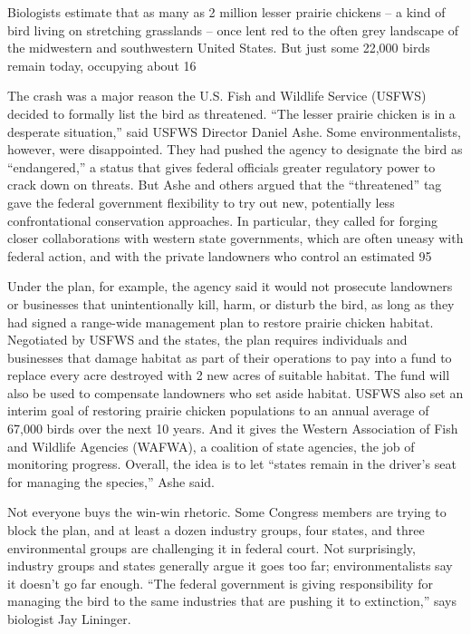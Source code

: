 Biologists estimate that as many as 2 million lesser prairie chickens – a kind of bird living on stretching grasslands – once lent red to the often grey landscape  of the midwestern and southwestern United States. But just some 22,000 birds remain today, occupying about 16%


The crash was a major reason the U.S. Fish and Wildlife Service (USFWS) decided to formally list the bird as threatened. ``The lesser prairie chicken is in a desperate situation,'' said USFWS Director Daniel Ashe. Some environmentalists, however, were disappointed. They had pushed the agency to designate the bird as ``endangered,'' a status that gives federal officials greater regulatory power to crack down on threats. But Ashe and others argued that the ``threatened'' tag gave the federal government flexibility to try out new, potentially less confrontational conservation approaches. In particular, they called for forging closer collaborations with western state governments, which are often uneasy with federal action, and with the private landowners who control an estimated 95%


Under the plan, for example, the agency said it would not prosecute landowners or businesses that unintentionally kill, harm, or disturb the bird, as long as they had signed a range-wide management plan to restore prairie chicken habitat. Negotiated by USFWS and the states, the plan requires individuals and businesses that damage habitat as part of their operations to pay into a fund to replace every acre destroyed with 2 new acres of suitable habitat. The fund will  also be used to compensate landowners who set aside habitat. USFWS also set an interim goal of restoring prairie chicken populations to an annual average of 67,000 birds over the next 10 years. And it gives the Western Association of Fish and Wildlife Agencies (WAFWA), a coalition of state agencies, the job of monitoring progress. Overall, the idea is to let ``states remain in the driver's seat for managing the species,'' Ashe said.


Not everyone buys the win-win rhetoric. Some Congress members are trying to block the plan, and at least a dozen industry groups, four states, and three environmental groups are challenging it in federal court. Not surprisingly, industry groups and states generally argue it goes too far; environmentalists say it doesn't go far enough. ``The federal government is giving responsibility for managing the bird to the same industries that are pushing it to extinction,'' says biologist Jay Lininger.